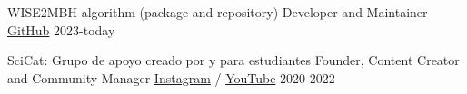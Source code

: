
\begin{cventries}
  \cventry
    {WISE2MBH algorithm (package and repository)}
    {Developer and Maintainer}
    {\href{https://github.com/joacoh/wise2mbh}{GitHub}}
    {2023-today}
    {}

  \cventry
    {SciCat: Grupo de apoyo creado por y para estudiantes}
    {Founder, Content Creator and Community Manager}
    {\href{https://www.instagram.com/scicat.cl/}{Instagram} /
     \href{https://www.youtube.com/channel/UC4y3QUrci4jNY9kQ2tiS67A}{YouTube}}
    {2020-2022}
    {}
    
\end{cventries}

